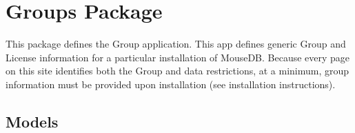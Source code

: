 \documentclass[letterpaper,10pt,english]{sphinxmanual}
\begin{document}
\section{Groups Package}
\label{api:module-groups}\label{api:groups-package}
This package defines the Group application.
This app defines generic Group and License information for a particular installation of MouseDB.  
Because every page on this site identifies both the Group and data restrictions, at a minimum, group information must be provided upon installation (see installation instructions).



\subsection{Models}
\label{api:id11}\label{api:module-groups.models}
\end{document}
